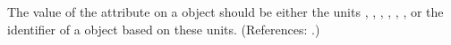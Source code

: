 The value of the attribute  on a \Model object should be
either the units , , ,
, , , or the identifier of a
\UnitDefinition object based on these units.  (References: .)
